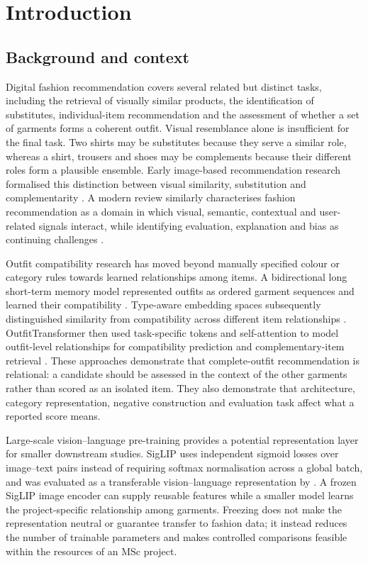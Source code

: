 \chapter{Introduction}

\section{Background and context}

Digital fashion recommendation covers several related but distinct tasks,
including the retrieval of visually similar products, the identification of
substitutes, individual-item recommendation and the assessment of whether a
set of garments forms a coherent outfit. Visual resemblance alone is
insufficient for the final task. Two shirts may be substitutes because they
serve a similar role, whereas a shirt, trousers and shoes may be complements
because their different roles form a plausible ensemble. Early image-based
recommendation research formalised this distinction between visual similarity,
substitution and complementarity \parencite{mcauley2015styles}. A modern review
similarly characterises fashion recommendation as a domain in which visual,
semantic, contextual and user-related signals interact, while identifying
evaluation, explanation and bias as continuing challenges
\parencite{deldjoo2023review}.

Outfit compatibility research has moved beyond manually specified
colour or category rules towards learned relationships among items. A
bidirectional long short-term memory model represented outfits as ordered
garment sequences and learned their compatibility \parencite{han2017bilstm}.
Type-aware embedding spaces subsequently distinguished similarity from
compatibility across different item relationships
\parencite{vasileva2018typeaware}. OutfitTransformer then used
task-specific tokens and self-attention to model outfit-level relationships
for compatibility prediction and complementary-item retrieval
\parencite{sarkar2023outfittransformer}. These approaches demonstrate that
complete-outfit recommendation is relational: a candidate should be assessed
in the context of the other garments rather than scored as an isolated item.
They also demonstrate that architecture, category representation, negative
construction and evaluation task affect what a reported score means.

Large-scale vision--language pre-training provides a potential representation
layer for smaller downstream studies. SigLIP uses independent sigmoid losses
over image--text pairs instead of requiring softmax normalisation across a
global batch, and was evaluated as a transferable vision--language
representation by \textcite{zhai2023siglip}. A frozen SigLIP image
encoder can supply reusable features while a smaller model learns
the project-specific relationship among garments. Freezing does not make the
representation neutral or guarantee transfer to fashion data; it instead
reduces the number of trainable parameters and makes controlled comparisons
feasible within the resources of an MSc project.

